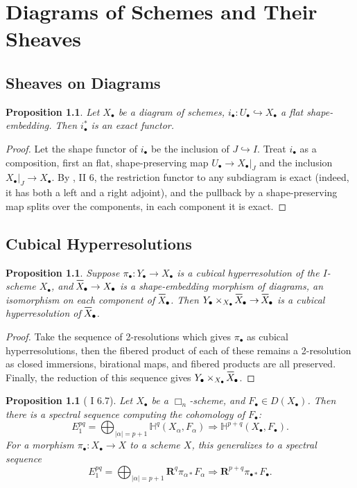 \documentclass{report}
\newtheorem{prop}[theorem]{Proposition}
\theoremstyle{definition}
\newcommand{\HH}{\mathbb{H}}
\newcommand{\bR}{\textbf{R}}
\newcommand*\xbar[1]{%
  \hbox{%
    \vbox{%
      \hrule height 0.5pt %
      \kern0.5ex%
      \hbox{%
        \kern-0.1em%
        \ensuremath{#1}%
        \kern-0.1em%
      }%
    }%
  }%
}
\begin{document}
	
\tableofcontents

\chapter{Diagrams of Schemes and Their Sheaves}
\section{Sheaves on Diagrams}
\begin{prop}
	Let $X_\bullet$ be a diagram of schemes, $i_\bullet : U_\bullet \hookrightarrow X_\bullet$ a flat shape-embedding.
	Then $i_\bullet^*$ is an exact functor.
\end{prop}
\begin{proof}
	Let the shape functor of $i_\bullet$ be the inclusion of $J \hookrightarrow I$.
	Treat $i_\bullet$ as a composition, first an flat, shape-preserving map $U_\bullet \rightarrow X_\bullet|_J$ and the inclusion $X_\bullet|_J \rightarrow X_\bullet$.
	By \cite{Lipman2009}, II 6, the restriction functor to any subdiagram is exact (indeed, it has both a left and a right adjoint), and the pullback by a shape-preserving map splits over the components, in each component it is exact.
\end{proof}
	
\section{Cubical Hyperresolutions}
\begin{prop}
	Suppose $\pi_\bullet : Y_\bullet \rightarrow X_\bullet$ is a cubical hyperresolution of the $I$-scheme $X_\bullet$, and $\xbar{X}_\bullet \rightarrow X_\bullet$ is a shape-embedding morphism of diagrams, an isomorphism on each component of $\xbar{X}_\bullet$.
	Then $Y_\bullet \times_{X_\bullet} \xbar{X}_\bullet \rightarrow \xbar{X}_\bullet$ is a cubical hyperresolution of $\xbar{X}_\bullet$.
\end{prop}
\begin{proof}
	Take the sequence of 2-resolutions which gives $\pi_\bullet$ as cubical hyperresolutions, then the fibered product of each of these remains a 2-resolution as closed immersions, birational maps, and fibered products are all preserved.
	Finally, the reduction of this sequence gives $Y_\bullet \times_{X_\bullet} \xbar{X}_\bullet$.
\end{proof}

\begin{prop}[\cite{Guillen1988} I 6.7]
	\label{prp:cubicalcohospecseq}
	Let $X_\bullet$ be a $\Box_n$-scheme, and $F_\bullet \in D(X_\bullet)$.
	Then there is a spectral sequence computing the cohomology of $F_\bullet$:
	\[
		E_1^{pq} = \bigoplus_{|\alpha| = p + 1} \HH^q(X_\alpha, F_\alpha) \Rightarrow \HH^{p+q}(X_\bullet, F_\bullet).
	\]
	For a morphism $\pi_\bullet : X_\bullet \rightarrow X$ to a scheme $X$, this generalizes to a spectral sequence
	\[
		E_1^{pq} = \bigoplus_{|\alpha| = p + 1} \bR^q \pi_{\alpha *}F_\alpha \Rightarrow \bR^{p+q} \pi_{\bullet *} F_\bullet.
	\]
\end{prop}
	
\end{document}
